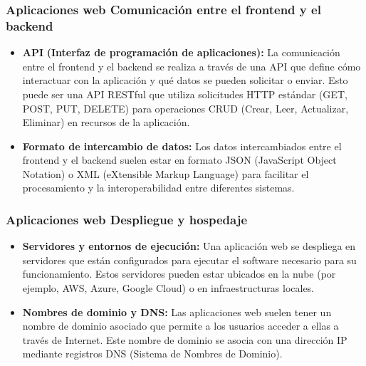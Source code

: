 \begin{frame}
	\frametitle{Aplicaciones web Comunicación entre el frontend y el backend}
	
	\begin{itemize}
		\item \textbf{API} \textbf{(Interfaz de programación de aplicaciones):} La comunicación entre el frontend y el backend se realiza a través de una API que define cómo interactuar con la aplicación y qué datos se pueden solicitar o enviar. Esto puede ser una API RESTful que utiliza solicitudes HTTP estándar (GET, POST, PUT, DELETE) para operaciones CRUD (Crear, Leer, Actualizar, Eliminar) en recursos de la aplicación.
		
		\item \textbf{Formato de intercambio de datos:} Los datos intercambiados entre el frontend y el backend suelen estar en formato JSON (JavaScript Object Notation) o XML (eXtensible Markup Language) para facilitar el procesamiento y la interoperabilidad entre diferentes sistemas.
		
	\end{itemize}	
\end{frame}
\begin{frame}
	\frametitle{Aplicaciones web Despliegue y hospedaje}
	
	\begin{itemize}
		\item\textbf{ Servidores y entornos de ejecución:} Una aplicación web se despliega en servidores que están configurados para ejecutar el software necesario para su funcionamiento. Estos servidores pueden estar ubicados en la nube (por ejemplo, AWS, Azure, Google Cloud) o en infraestructuras locales.
		
		\item \textbf{Nombres de dominio y DNS:} Las aplicaciones web suelen tener un nombre de dominio asociado que permite a los usuarios acceder a ellas a través de Internet. Este nombre de dominio se asocia con una dirección IP mediante registros DNS (Sistema de Nombres de Dominio).
		
	\end{itemize}	
\end{frame}
